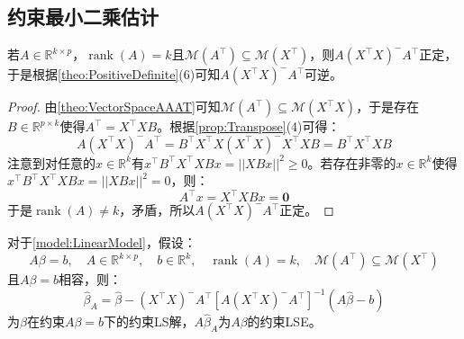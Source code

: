 \subsection{约束最小二乘估计}
\begin{lemma}\label{lem:AXTXAT}
	若$A\in\mathbb{R}^{k\times p}$，$\operatorname{rank}(A)=k$且$\mathcal{M}(A^{\top})\subseteq\mathcal{M}(X^{\top})$，则$A(X^{\top}X)^{-}A^{\top}$正定，于是根据\cref{theo:PositiveDefinite}(6)可知$A(X^{\top}X)^{-}A^{\top}$可逆。
\end{lemma}
\begin{proof}
	由\cref{theo:VectorSpaceAAAT}可知$\mathcal{M}(A^{\top})\subseteq\mathcal{M}(X^{\top}X)$，于是存在$B\in\mathbb{R}^{p\times k}$使得$A^{\top}=X^{\top}XB$。根据\cref{prop:Transpose}(4)可得：
	\begin{equation*}
		A(X^{\top}X)^{-}A^{\top}=B^{\top}X^{\top}X(X^{\top}X)^{-}X^{\top}XB=B^{\top}X^{\top}XB
	\end{equation*}
	注意到对任意的$x\in\mathbb{R}^k$有$x^{\top}B^{\top}X^{\top}XBx=||XBx||^2\geqslant0$。若存在非零的$x\in\mathbb{R}^k$使得$x^{\top}B^{\top}X^{\top}XBx=||XBx||^2=0$，则：
	\begin{equation*}
		A^{\top}x=X^{\top}XBx=\mathbf{0}
	\end{equation*}
	于是$\operatorname{rank}(A)\ne k$，矛盾，所以$A(X^{\top}X)^{-}A^{\top}$正定。
\end{proof}
\begin{theorem}\label{theo:ConstraintLinearModel}
	对于\cref{model:LinearModel}，假设：
	\begin{equation*}
		A\beta=b,\quad A\in\mathbb{R}^{k\times p},\quad b\in\mathbb{R}^k,\quad\operatorname{rank}(A)=k,\quad\mathcal{M}(A^{\top})\subseteq\mathcal{M}(X^{\top})
	\end{equation*}
	且$A\beta=b$相容，则：
	\begin{equation*}
		\hat{\beta}_A=\hat{\beta}-(X^{\top}X)^-A^{\top}[A(X^{\top}X)^-A^{\top}]^{-1}(A\hat{\beta}-b)
	\end{equation*}
	为$\beta$在约束$A\beta=b$下的约束LS解，$A\hat{\beta}_A$为$A\beta$的约束LSE。
\end{theorem}
